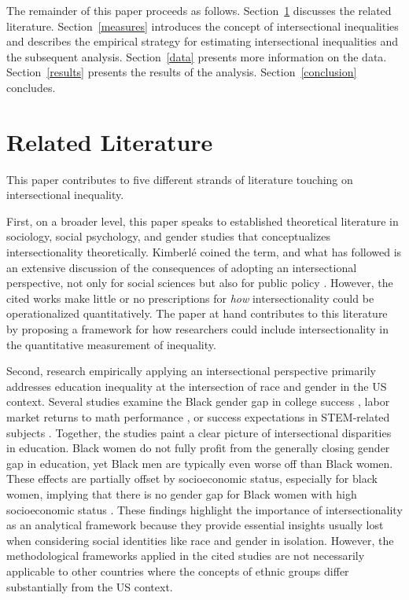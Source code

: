 The remainder of this paper proceeds as follows. Section~\ref{sec:literature} discusses the related literature. Section~\ref{measures} introduces the concept of intersectional inequalities and describes the empirical strategy for estimating intersectional inequalities and the subsequent analysis. Section~\ref{data} presents more information on the data. Section~\ref{results} presents the results of the analysis. Section~\ref{conclusion} concludes.

\section{Related Literature}\label{sec:literature}

This paper contributes to five different strands of literature touching on intersectional inequality. 

First, on a broader level, this paper speaks to established theoretical literature in sociology, social psychology, and gender studies that conceptualizes intersectionality theoretically. Kimberlé \cite{crenshaw1989} coined the term, and what has followed is an extensive discussion of the consequences of adopting an intersectional perspective, not only for social sciences but also for public policy \citep[to name just a few examples:][]{alexander-floyd2012, berger2010, bowleg2008, cho2013, choo2010, few-demo2014, hancock2007, shields2008, strid2013, walby2012}. However, the cited works make little or no prescriptions for \textit{how} intersectionality could be operationalized quantitatively. The paper at hand contributes to this literature by proposing a framework for how researchers could include intersectionality in the quantitative measurement of inequality.

Second, research empirically applying an intersectional perspective primarily addresses education inequality at the intersection of race and gender in the US context. Several studies examine the Black gender gap in college success \citep{Keels2013, McDaniel2011, Mittleman2021}, labor market returns to math performance \citep{Riegle-Crumb2006}, or success expectations in STEM-related subjects \citep[][review article]{Parker2020}. Together, the studies paint a clear picture of intersectional disparities in education. Black women do not fully profit from the generally closing gender gap in education, yet Black men are typically even worse off than Black women. These effects are partially offset by socioeconomic status, especially for black women, implying that there is no gender gap for Black women with high socioeconomic status \citep{Keels2013}. These findings highlight the importance of intersectionality as an analytical framework because they provide essential insights usually lost when considering social identities like race and gender in isolation. However, the methodological frameworks applied in the cited studies are not necessarily applicable to other countries where the concepts of ethnic groups differ substantially from the US context.

